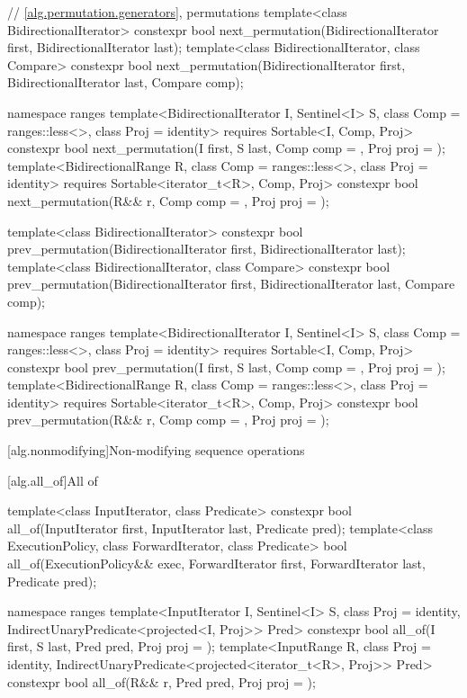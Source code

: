 \begin{codeblock}
{  // \ref{alg.permutation.generators}, permutations
  template<class BidirectionalIterator>
    constexpr bool next_permutation(BidirectionalIterator first,
                                    BidirectionalIterator last);
  template<class BidirectionalIterator, class Compare>
    constexpr bool next_permutation(BidirectionalIterator first,
                                    BidirectionalIterator last, Compare comp);

  namespace ranges {
    template<BidirectionalIterator I, Sentinel<I> S, class Comp = ranges::less<>,
        class Proj = identity>
      requires Sortable<I, Comp, Proj>
      constexpr bool
        next_permutation(I first, S last, Comp comp = {}, Proj proj = {});
    template<BidirectionalRange R, class Comp = ranges::less<>,
        class Proj = identity>
      requires Sortable<iterator_t<R>, Comp, Proj>
      constexpr bool
        next_permutation(R&& r, Comp comp = {}, Proj proj = {});
  }

  template<class BidirectionalIterator>
    constexpr bool prev_permutation(BidirectionalIterator first,
                                    BidirectionalIterator last);
  template<class BidirectionalIterator, class Compare>
    constexpr bool prev_permutation(BidirectionalIterator first,
                                    BidirectionalIterator last, Compare comp);

  namespace ranges {
    template<BidirectionalIterator I, Sentinel<I> S, class Comp = ranges::less<>,
        class Proj = identity>
      requires Sortable<I, Comp, Proj>
      constexpr bool
        prev_permutation(I first, S last, Comp comp = {}, Proj proj = {});
    template<BidirectionalRange R, class Comp = ranges::less<>,
        class Proj = identity>
      requires Sortable<iterator_t<R>, Comp, Proj>
      constexpr bool
        prev_permutation(R&& r, Comp comp = {}, Proj proj = {});
  }
}
\end{codeblock}

[alg.nonmodifying]{Non-modifying sequence operations}

[alg.all_of]{All of}

%
\begin{itemdecl}
template<class InputIterator, class Predicate>
  constexpr bool all_of(InputIterator first, InputIterator last, Predicate pred);
template<class ExecutionPolicy, class ForwardIterator, class Predicate>
  bool all_of(ExecutionPolicy&& exec, ForwardIterator first, ForwardIterator last,
              Predicate pred);

namespace ranges {
  template<InputIterator I, Sentinel<I> S, class Proj = identity,
      IndirectUnaryPredicate<projected<I, Proj>> Pred>
    constexpr bool all_of(I first, S last, Pred pred, Proj proj = {});
  template<InputRange R, class Proj = identity,
      IndirectUnaryPredicate<projected<iterator_t<R>, Proj>> Pred>
    constexpr bool all_of(R&& r, Pred pred, Proj proj = {});
}
\end{itemdecl}

